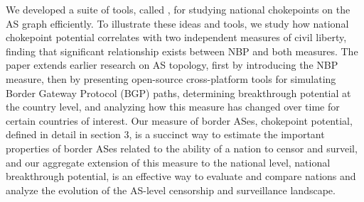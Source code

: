 We developed a
suite of tools, called \toolname{}, for studying national chokepoints on
the AS graph efficiently. To illustrate these ideas and tools, we
study how national chokepoint potential correlates with two independent
measures of civil liberty, finding that significant relationship exists between NBP and both measures.
The paper extends earlier research on AS topology, first by introducing the NBP measure, 
then by presenting open-source cross-platform tools for simulating Border Gateway Protocol (BGP) paths,
determining breakthrough potential at the country level, and analyzing how this measure has changed over time for certain countries of interest.
Our measure of border ASes, chokepoint potential, defined in detail
in section 3, is a succinct way to estimate the important properties of
border ASes related to the ability of a nation to censor and surveil, and our aggregate extension of this measure to
the national level, national breakthrough potential, is an effective way to evaluate and
compare nations and analyze the evolution of the AS-level censorship and surveillance landscape.









